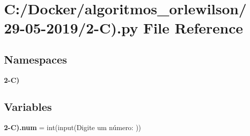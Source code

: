 \section{C\+:/\+Docker/algoritmos\+\_\+orlewilson/29-\/05-\/2019/2-\/C).py File Reference}
\label{2-_c_08_8py}
\subsection*{Namespaces}
\begin{DoxyCompactItemize}
\item 
 \textbf{ 2-\/\+C)}
\end{DoxyCompactItemize}
\subsection*{Variables}
\begin{DoxyCompactItemize}
\item 
\textbf{ 2-\/\+C).\+num} = int(input(\textquotesingle{}Digite um número\+: \textquotesingle{}))
\end{DoxyCompactItemize}
